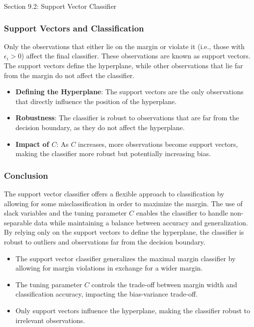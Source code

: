 \begin{notes}{Section 9.2: Support Vector Classifier}
    \subsubsection*{Support Vectors and Classification}
    
    Only the observations that either lie on the margin or violate it (i.e., those with $\epsilon_i > 0$) affect the final classifier. These observations are known as support vectors. The support vectors 
    define the hyperplane, while other observations that lie far from the margin do not affect the classifier.
    
    \begin{highlight}
        \begin{itemize}
            \item \textbf{Defining the Hyperplane}: The support vectors are the only observations that directly influence the position of the hyperplane.
            \item \textbf{Robustness}: The classifier is robust to observations that are far from the decision boundary, as they do not affect the hyperplane.
            \item \textbf{Impact of $C$}: As $C$ increases, more observations become support vectors, making the classifier more robust but potentially increasing bias.
        \end{itemize}
    \end{highlight}
    
    \subsubsection*{Conclusion}
    
    The support vector classifier offers a flexible approach to classification by allowing for some misclassification in order to maximize the margin. The use of slack variables and the tuning parameter $C$ 
    enables the classifier to handle non-separable data while maintaining a balance between accuracy and generalization. By relying only on the support vectors to define the hyperplane, the classifier is robust 
    to outliers and observations far from the decision boundary.
    
    \begin{highlight}
        \begin{itemize}
            \item The support vector classifier generalizes the maximal margin classifier by allowing for margin violations in exchange for a wider margin.
            \item The tuning parameter $C$ controls the trade-off between margin width and classification accuracy, impacting the bias-variance trade-off.
            \item Only support vectors influence the hyperplane, making the classifier robust to irrelevant observations.
        \end{itemize}
    \end{highlight}
\end{notes}

